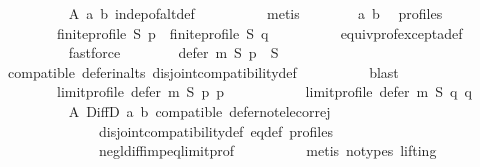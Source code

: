 \begin{isabellebody}
\ \ \ \ \ \ \ \ \isamarkupfalse%
\ A\ a\ b\ indep{\isacharunderscore}{\kern0pt}of{\isacharunderscore}{\kern0pt}alt{\isacharunderscore}{\kern0pt}def\isanewline
\ \ \ \ \ \ \ \ \isamarkupfalse%
\ metis\isanewline
\ \ \ \ \ \ \isamarkupfalse%
\ a\ b\ \isamarkupfalse%
\ profiles{\isacharcolon}{\kern0pt}\isanewline
\ \ \ \ \ \ \ \ {\isachardoublequoteopen}finite{\isacharunderscore}{\kern0pt}profile\ S\ p\ {\isasymand}\ finite{\isacharunderscore}{\kern0pt}profile\ S\ q{\isachardoublequoteclose}\isanewline
\ \ \ \ \ \ \ \ \isamarkupfalse%
\ equiv{\isacharunderscore}{\kern0pt}prof{\isacharunderscore}{\kern0pt}except{\isacharunderscore}{\kern0pt}a{\isacharunderscore}{\kern0pt}def\isanewline
\ \ \ \ \ \ \ \ \isamarkupfalse%
\ fastforce\isanewline
\ \ \ \ \ \ \isamarkupfalse%
\ {\isachardoublequoteopen}{\isacharparenleft}{\kern0pt}defer\ m\ S\ p{\isacharparenright}{\kern0pt}\ {\isasymsubseteq}\ S{\isachardoublequoteclose}\isanewline
\ \ \ \ \ \ \ \ \isamarkupfalse%
\ compatible\ defer{\isacharunderscore}{\kern0pt}in{\isacharunderscore}{\kern0pt}alts\ disjoint{\isacharunderscore}{\kern0pt}compatibility{\isacharunderscore}{\kern0pt}def\isanewline
\ \ \ \ \ \ \ \ \isamarkupfalse%
\ blast\isanewline
\ \ \ \ \ \ \isamarkupfalse%
\isanewline
\ \ \ \ \ \ \ \ {\isachardoublequoteopen}limit{\isacharunderscore}{\kern0pt}profile\ {\isacharparenleft}{\kern0pt}defer\ m\ S\ p{\isacharparenright}{\kern0pt}\ p\ {\isacharequal}{\kern0pt}\isanewline
\ \ \ \ \ \ \ \ \ \ limit{\isacharunderscore}{\kern0pt}profile\ {\isacharparenleft}{\kern0pt}defer\ m\ S\ q{\isacharparenright}{\kern0pt}\ q{\isachardoublequoteclose}\isanewline
\ \ \ \ \ \ \ \ \isamarkupfalse%
\ A\ DiffD{}\ a\ b\ compatible\ defer{\isacharunderscore}{\kern0pt}not{\isacharunderscore}{\kern0pt}elec{\isacharunderscore}{\kern0pt}or{\isacharunderscore}{\kern0pt}rej\isanewline
\ \ \ \ \ \ \ \ \ \ \ \ \ \ disjoint{\isacharunderscore}{\kern0pt}compatibility{\isacharunderscore}{\kern0pt}def\ eq{\isacharunderscore}{\kern0pt}def\ profiles\isanewline
\ \ \ \ \ \ \ \ \ \ \ \ \ \ negl{\isacharunderscore}{\kern0pt}diff{\isacharunderscore}{\kern0pt}imp{\isacharunderscore}{\kern0pt}eq{\isacharunderscore}{\kern0pt}limit{\isacharunderscore}{\kern0pt}prof\isanewline
\ \ \ \ \ \ \ \ \isamarkupfalse%
\ {\isacharparenleft}{\kern0pt}metis\ {\isacharparenleft}{\kern0pt}no{\isacharunderscore}{\kern0pt}types{\isacharcomma}{\kern0pt}\ lifting{\isacharparenright}{\kern0pt}{\isacharparenright}{\kern0pt}\isanewline

\end{isabellebody}
